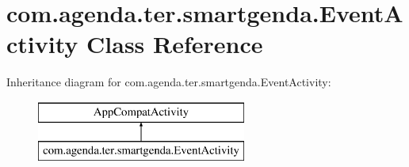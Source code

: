 \hypertarget{classcom_1_1agenda_1_1ter_1_1smartgenda_1_1_event_activity}{\section{com.\-agenda.\-ter.\-smartgenda.\-Event\-Activity Class Reference}
\label{classcom_1_1agenda_1_1ter_1_1smartgenda_1_1_event_activity}
}
Inheritance diagram for com.\-agenda.\-ter.\-smartgenda.\-Event\-Activity\-:\begin{figure}[H]
\begin{center}
\leavevmode
\includegraphics[height=2.000000cm]{classcom_1_1agenda_1_1ter_1_1smartgenda_1_1_event_activity}
\end{center}
\end{figure}
